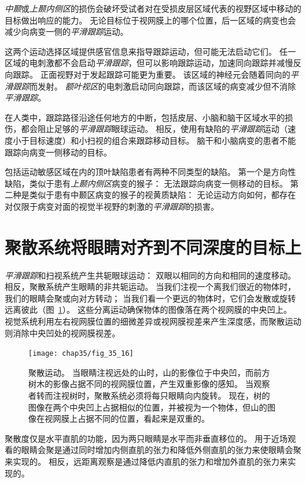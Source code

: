 \textit{中颞}或\textit{上颞内侧区}的损伤会破坏受试者对在受损皮层区域代表的视野区域中移动的目标做出响应的能力。
无论目标位于视网膜上的哪个位置，后一区域的病变也会减少向病变一侧的\textit{平滑跟踪}运动。


这两个运动选择区域提供感官信息来指导跟踪运动，但可能无法启动它们。
任一区域的电刺激都不会启动\textit{平滑跟踪}，但可以影响跟踪运动，加速同向跟踪并减慢反向跟踪。
正面视野对于发起跟踪可能更为重要。
该区域的神经元会随着同向的\textit{平滑跟踪}而发射。
\textit{额叶视区}的电刺激启动同向跟踪，而该区域的病变减少但不消除\textit{平滑跟踪}。


在人类中，跟踪路径沿途任何地方的中断，包括皮层、小脑和脑干区域水平的损伤，都会阻止足够的\textit{平滑跟踪}眼球运动。
相反，使用有缺陷的\textit{平滑跟踪}运动（速度小于目标速度）和小扫视的组合来跟踪移动目标。
脑干和小脑病变的患者不能跟踪向病变一侧移动的目标。


包括运动敏感区域在内的顶叶缺陷患者有两种不同类型的缺陷。
第一个是方向性缺陷，类似于患有\textit{上颞内侧区}病变的猴子：
无法跟踪向病变一侧移动的目标。
第二种是类似于患有中颞区病变的猴子的视黄质缺陷：
无论运动方向如何，都存在对仅限于病变对面的视觉半视野的刺激的\textit{平滑跟踪}的损害。



\section{聚散系统将眼睛对齐到不同深度的目标上}

\textit{平滑跟踪}和扫视系统产生共轭眼球运动：
双眼以相同的方向和相同的速度移动。
相反，聚散系统产生眼睛的非共轭运动。
当我们注视一个离我们很近的物体时，我们的眼睛会聚或向对方转动；
当我们看一个更远的物体时，它们会发散或旋转远离彼此（图~\ref{fig:35_16}）。
这些分离运动确保物体的图像落在两个视网膜的中央凹上。
视觉系统利用左右视网膜位置的细微差异或视网膜视差来产生深度感，而聚散运动则消除中央凹处的视网膜视差。


\begin{figure}[htbp]
	\centering
	\texttt{[image: chap35/fig\_35\_16]}
	\caption{聚散运动。
		当眼睛注视远处的山时，山的影像位于中央凹，而前方树木的影像占据不同的视网膜位置，产生双重影像的感知。
		当观察者转而注视树时，聚散系统必须将每只眼睛向内旋转。
		现在，树的图像在两个中央凹上占据相似的位置，并被视为一个物体，但山的图像在视网膜上占据不同的位置，看起来是双重的。}
	\label{fig:35_16}
\end{figure}


聚散度仅是水平直肌的功能，因为两只眼睛是水平而非垂直移位的。
用于近场观看的眼睛会聚是通过同时增加内侧直肌的张力和降低外侧直肌的张力来使眼睛会聚来实现的。
相反，远距离观察是通过降低内直肌的张力和增加外直肌的张力来实现的。


